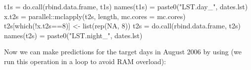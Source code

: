 \documentclass[
  graybox,natbib,nospthms]{svmono}
\newenvironment{Shaded}{\begin{snugshade}}{\end{snugshade}}
\newcommand{\AttributeTok}[1]{\textcolor[rgb]{0.61,0.61,0.61}{#1}}
\newcommand{\ConstantTok}[1]{\textcolor[rgb]{0,0,0}{#1}}
\newcommand{\DecValTok}[1]{\textcolor[rgb]{0.06,0.06,0.06}{#1}}
\newcommand{\FunctionTok}[1]{\textcolor[rgb]{0,0,0}{#1}}
\newcommand{\NormalTok}[1]{#1}
\newcommand{\OtherTok}[1]{\textcolor[rgb]{0.37,0.37,0.37}{#1}}
\newcommand{\SpecialCharTok}[1]{\textcolor[rgb]{0,0,0}{#1}}
\newcommand{\StringTok}[1]{\textcolor[rgb]{0.5,0.5,0.5}{#1}}
\begin{document}
\begin{Shaded}
\begin{Highlighting}[]
\NormalTok{t1s }\OtherTok{=} \FunctionTok{do.call}\NormalTok{(rbind.data.frame, t1s)}
\FunctionTok{names}\NormalTok{(t1s) }\OtherTok{=} \FunctionTok{paste0}\NormalTok{(}\StringTok{"LST.day\_"}\NormalTok{, dates.lst)}
\NormalTok{x.t2s }\OtherTok{=}\NormalTok{ parallel}\SpecialCharTok{::}\FunctionTok{mclapply}\NormalTok{(t2s, length, }\AttributeTok{mc.cores =}\NormalTok{ mc.cores)}
\NormalTok{t2s[}\FunctionTok{which}\NormalTok{(}\SpecialCharTok{!}\NormalTok{x.t2s}\SpecialCharTok{==}\DecValTok{8}\NormalTok{)] }\OtherTok{\textless{}{-}} \FunctionTok{list}\NormalTok{(}\FunctionTok{rep}\NormalTok{(}\ConstantTok{NA}\NormalTok{, }\DecValTok{8}\NormalTok{))}
\NormalTok{t2s }\OtherTok{=} \FunctionTok{do.call}\NormalTok{(rbind.data.frame, t2s)}
\FunctionTok{names}\NormalTok{(t2s) }\OtherTok{=} \FunctionTok{paste0}\NormalTok{(}\StringTok{"LST.night\_"}\NormalTok{, dates.lst)}
\end{Highlighting}
\end{Shaded}

Now we can make predictions for the target days in August 2006 by using (we run
this operation in a loop to avoid RAM overload):
\end{document}
